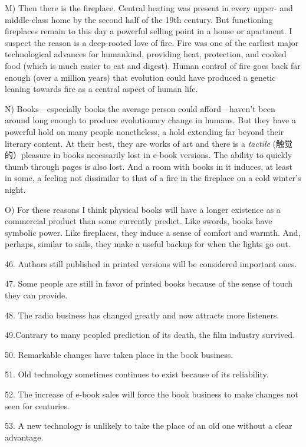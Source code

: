 \documentclass[UTF8,11pt]{ctexart}
\begin{document}
M) Then there is the fireplace. Central heating was present in every upper- and middle-class home by the second half of the 19th century. But functioning fireplaces remain to this day a powerful selling point in a house or apartment. I suspect the reason is a deep-rooted love of fire. Fire was one of the earliest major technological advances for humankind, providing heat, protection, and cooked food (which is much easier to eat and digest). Human control of fire goes back far enough (over a million years) that evolution could have produced a genetic leaning towards fire as a central aspect of human life.


N) Books—especially books the average person could afford—haven’t been around long enough to produce evolutionary change in humans. But they have a powerful hold on many people nonetheless, a hold extending far beyond their literary content. At their best, they are works of art and there is a\textit{ tactile} (触觉的）pleasure in books necessarily lost in e-book versions. The ability to quickly thumb through pages is also lost. And a room with books in it induces, at least in some, a feeling not dissimilar to that of a fire in the fireplace on a cold winter’s night.


O) For these reasons I think physical books will have a longer existence as a commercial product than some currently predict. Like swords, books have symbolic power. Like fireplaces, they induce a sense of comfort and warmth. And, perhaps, similar to sails, they make a useful backup for when the lights go out.


46. Authors still published in printed versions will be considered important ones.


47. Some people are still in favor of printed books because of the sense of touch they can provide.


48. The radio business has changed greatly and now attracts more listeners.


49.Contrary to many peopled prediction of its death, the film industry survived.


50. Remarkable changes have taken place in the book business.


51. Old technology sometimes continues to exist because of its reliability.


52. The increase of e-book sales will force the book business to make changes not seen for centuries.


53. A new technology is unlikely to take the place of an old one without a clear advantage.
\end{document}
